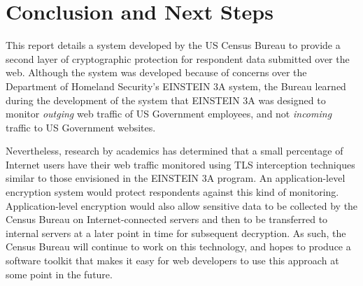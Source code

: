 \documentclass[fleqn,10pt]{wlscirep}
\begin{document}
\section{Conclusion and Next Steps}

This report details a system developed by the US
Census Bureau to provide a second layer of cryptographic protection
for respondent data submitted over the web. Although the system was
developed because of concerns over the Department of Homeland
Security's EINSTEIN 3A system, the Bureau learned during the
development of the system that EINSTEIN 3A was designed to monitor
\emph{outging} web traffic of US Government employees, and not
\emph{incoming} traffic to US Government websites.

Nevertheless, research by academics has determined that a small
percentage of Internet users have their web traffic monitored using
TLS interception techniques similar to those envisioned in the
EINSTEIN 3A program. An application-level encryption system would
protect respondents against this kind of monitoring. Application-level
encryption would also allow sensitive data to be collected by the
Census Bureau on Internet-connected servers and then to be transferred 
to internal servers at a later point in time for subsequent
decryption. As such, the Census Bureau will continue to work on this
technology, and hopes to produce a software toolkit that makes it easy
for web developers to use this approach at some point in the future.
\end{document}
